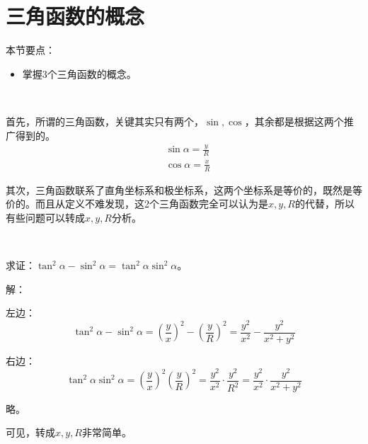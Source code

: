 \section{三角函数的概念}

本节要点：
\begin{itemize}
    \item 掌握3个三角函数的概念。
\end{itemize}

~

首先，所谓的三角函数，关键其实只有两个，$\sin ,\cos $，其余都是根据这两个推广得到的。
\begin{align*}
&\sin \alpha =\frac{y}{R} \\
&\cos \alpha =\frac{x}{R}
\end{align*}

其次，三角函数联系了直角坐标系和极坐标系，这两个坐标系是等价的，既然是等价的。而且从定义不难发现，这2个三角函数完全可以认为是$x,y,R$的代替，所以有些问题可以转成$x,y,R$分析。

~

\begin{example}
求证：$\tan ^2\alpha -\sin ^2\alpha =\tan ^2\alpha \sin ^2\alpha $。
\end{example}

解：

左边：
\[
\tan ^2\alpha -\sin ^2\alpha =\left( \frac{y}{x} \right) ^2-\left( \frac{y}{R} \right) ^2=\frac{y^2}{x^2}-\frac{y^2}{x^2+y^2}
\]

右边：
\[
\tan ^2\alpha \sin ^2\alpha =\left( \frac{y}{x} \right) ^2\left( \frac{y}{R} \right) ^2=\frac{y^2}{x^2}\cdot \frac{y^2}{R^2}=\frac{y^2}{x^2}\cdot \frac{y^2}{x^2+y^2}
\]

略。

\begin{tcolorbox}
可见，转成$x,y,R$非常简单。
\end{tcolorbox}




